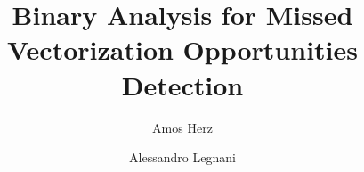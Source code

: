 \documentclass[acmsmall,review, nonacm]{acmart}
\begin{document}
\title{Binary Analysis for Missed Vectorization Opportunities Detection}

\author{Amos Herz}
\author{Alessandro Legnani}


\renewcommand{\shortauthors}{Herz and Legnani}

\begin{abstract}
  
\end{abstract}

\end{document}
